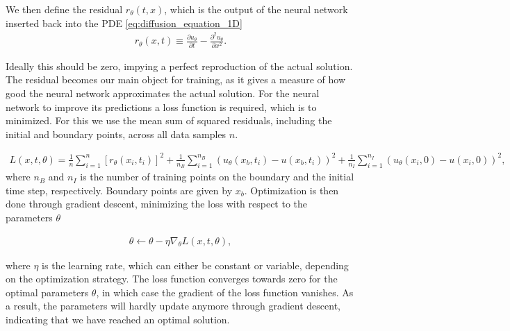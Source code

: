 \documentclass[12pt]{extarticle}
\begin{document}
\par We then define the residual $r_\theta(t, x)$, which is the output of the neural network inserted back into the PDE \eqref{eq:diffusion_equation_1D}
\begin{align}
	r_\theta(x, t) \equiv \frac{\partial u_\theta}{\partial t} - \frac{\partial^2 u_\theta}{\partial x^2}.
	\label{eq:residual}
\end{align}

Ideally this should be zero, impying a perfect reproduction of the actual solution. The residual becomes our main object for training, as it gives a measure of how good the neural network approximates the actual solution. For the neural network to improve its predictions a loss function is required, which is to minimized. For this we use the mean sum of squared residuals, including the initial and boundary points, across all data samples $n$. 

\begin{align*}
	L(x, t, \theta) = \frac{1}{n} \sum_{i=1}^n [r_\theta(x_i,t_i)]^2 + \frac{1}{n_B}\sum_{i=1}^{n_B} (u_{\theta}(x_b,t_i) - u(x_b,t_i))^2 + \frac{1}{n_I} \sum_{i=1}^{n_I} (u_{\theta}(x_i,0) - u(x_i,0))^2,
\end{align*}
where $n_B$ and $n_I$ is the number of training points on the boundary and the initial time step, respectively. Boundary points are given by $x_b$.
Optimization is then done through gradient descent, minimizing the loss with respect to the parameters $\theta$

\begin{align*}
	\theta \leftarrow \theta - \eta \nabla_{\theta}L(x,t,\theta),
\end{align*}

where $\eta$ is the learning rate, which can either be constant or variable, depending on the optimization strategy.
The loss function converges towards zero for the optimal parameters $\theta$, in which case the gradient of the loss function vanishes. As a result, the parameters will hardly update anymore through gradient descent, indicating that we have reached an optimal solution.
\end{document}
